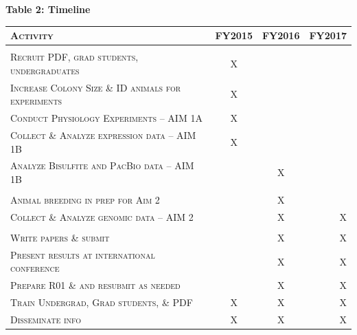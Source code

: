 \documentclass[12pt]{article}
\begin{document}
\vspace{3mm}
\textbf{Table 2: Timeline}
\hypertarget{Table 2}{}
\begin{center}
\begin{tabular}{l|c c r}

\textsc{Activity} & \textsc{FY2015} & \textsc{FY2016} & \textsc{FY2017} \\
\hline \\
\textsc{Recruit PDF, grad students, undergraduates} & X & & \\
\textsc{Increase Colony Size \& ID animals for experiments } & X & & \\
\textsc{Conduct Physiology Experiments -- AIM 1A} & X & & \\
\textsc{Collect \& Analyze expression data -- AIM 1B} & X & & \\
\textsc{Analyze Bisulfite and PacBio data -- AIM 1B} & & X & \\
\textsc{} & &  &   \\
\textsc{Animal breeding in prep for Aim 2} & & X &  \\
\textsc{Collect \& Analyze genomic data -- AIM 2} & & X & X \\
\textsc{} & &  &   \\
\textsc{Write papers \& submit} & & X & X \\
\textsc{Present results at international conference} & & X & X \\
\textsc{Prepare R01 \& and resubmit as needed} & & X & X \\
\textsc{Train Undergrad, Grad students, \& PDF} & X & X & X \\
\textsc{Disseminate info} & X & X & X \\

\end{tabular}
\end{center}
\vspace{5mm}

\newpage
\setcounter{page}{1}
\singlespacing



\end{document}

